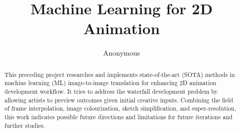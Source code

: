 
\title{Machine Learning for 2D Animation}
\author{Anonymous}  %

\maketitle
\makedeclaration

\begin{abstract} %
This preceding project researches and implements state-of-the-art (SOTA) methods in machine learning (ML) image-to-image translation for enhancing 2D animation development workflow. It tries to address the waterfall development problem by allowing artists to preview outcomes given initial creative inputs. Combining the field of frame interpolation, image colourization, sketch simplification, and super-resolution, this work indicates possible future directions and limitations for future iterations and further studies.
\end{abstract}


